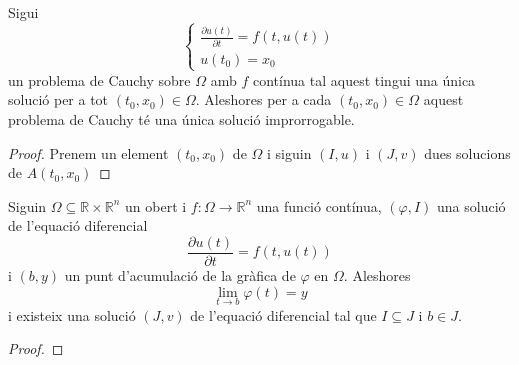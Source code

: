 \documentclass[../Apunts.tex]{subfiles}
\begin{document}
	\begin{proposition}
		\label{prop:la solució improrrogable és única}
		Sigui
		\[\begin{cases}
			\displaystyle \frac{\partial u(t)}{\partial t}=f(t,u(t)) \\
			\displaystyle u(t_{0})=x_{0}
		\end{cases}\]
		un problema de Cauchy sobre \(\Omega\) amb \(f\) contínua tal aquest tingui una única solució per a tot \((t_{0},x_{0})\in\Omega\). Aleshores per a cada \((t_{0},x_{0})\in\Omega\) aquest problema de Cauchy té una única solució improrrogable.
		\begin{proof}
			Prenem un element \((t_{0},x_{0})\) de \(\Omega\) i siguin \((I,u)\) i \((J,v)\) dues solucions de \(A(t_{0},x_{0})\)
		\end{proof}
	\end{proposition}
	\begin{theorem}
		\label{thm:Lema de Wintner}
		Siguin \(\Omega\subseteq\mathbb{R}\times\mathbb{R}^{n}\) un obert i \(f\colon\Omega\longrightarrow\mathbb{R}^{n}\) una funció contínua, \((\varphi,I)\) una solució de l'equació diferencial
		\[\frac{\partial u(t)}{\partial t}=f(t,u(t))\]
		i \((b,y)\) un punt d'acumulació de la gràfica de \(\varphi\) en \(\Omega\). Aleshores
		\[\lim_{t\to b}\varphi(t)=y\]
		i existeix una solució \((J,v)\) de l'equació diferencial tal que \(I\subseteq J\) i \(b\in J\).
		\begin{proof}
		\end{proof}
	\end{theorem}
\end{document}
